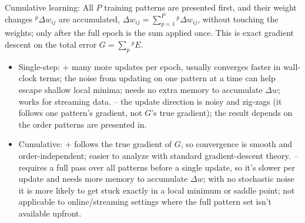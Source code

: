 \documentclass[11pt,a4paper]{article}
\begin{document}
Cumulative learning: All $P$ training patterns are presented first, and their weight changes
${}^p\Delta w_{ij}$ are accumulated, $\Delta w_{ij}=\sum_{p=1}^P {}^p\Delta w_{ij}$, without touching the
weights; only after the full epoch is the sum applied once. This is exact gradient descent on the total error
$G=\sum_p {}^pE$.

\begin{itemize}
  \item Single-step: + many more updates per epoch, usually converges faster in wall-clock
  terms; the noise from updating on one pattern at a time can help escape shallow local minima; needs no extra
  memory to accumulate $\Delta w$; works for streaming data. \emph{--} the update direction is noisy and
  zig-zags (it follows one pattern's gradient, not $G$'s true gradient); the result depends on the order
  patterns are presented in.
  \item Cumulative: + follows the true gradient of $G$, so convergence is smooth and
  order-independent; easier to analyze with standard gradient-descent theory. \emph{--} requires a full pass
  over all patterns before a single update, so it's slower per update and needs more memory to accumulate
  $\Delta w$; with no stochastic noise it is more likely to get stuck exactly in a local minimum or saddle
  point; not applicable to online/streaming settings where the full pattern set isn't available upfront.
\end{itemize}
\end{document}
